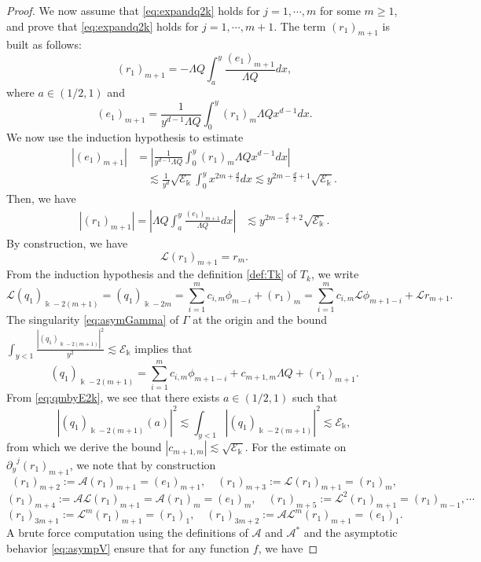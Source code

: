 \documentclass[11pt]{aims}
\theoremstyle{definition}
\numberwithin{equation}{section}
\begin{document}
\begin{proof}
We now assume that \eqref{eq:expandq2k} holds for $j = 1, \cdots, m$  for some $m \geq 1$, and prove that \eqref{eq:expandq2k} holds for $j = 1, \cdots, m + 1$. The term $(r_1)_{m + 1}$ is built as follows:
$$(r_1)_{m + 1} = - \Lambda Q\int_a^y \frac{(e_1)_{m + 1}}{\Lambda Q} dx,$$
where $a \in (1/2, 1)$ and 
$$(e_1)_{m + 1} = \frac{1}{y^{d-1}\Lambda Q}\int_0^y (r_1)_{m} \Lambda Q x^{d-1}dx.$$
We now use the induction hypothesis to estimate
\begin{align*}
|(e_1)_{m + 1}| &= \left|\frac{1}{y^{d-1} \Lambda Q}\int_0^y (r_1)_{m} \Lambda Q x^{d-1}dx \right| \\
&\quad \lesssim \frac{1}{y^d}\sqrt{{\mathscr{E}}_{\Bbbk}}\int_0^y x^{2m + \frac{d}{2}} dx \lesssim y^{2m - \frac{d}{2} + 1} \sqrt{{\mathscr{E}}_{\Bbbk}}.
\end{align*}
Then, we have
\begin{align*}
|(r_1)_{m + 1}| = \left|\Lambda Q\int_a^y \frac{(e_1)_{m +1}}{\Lambda Q} dx\right| &\lesssim y^{2m - \frac{d}{2} + 2} \sqrt{{\mathscr{E}}_\Bbbk}.
\end{align*}
By construction, we have 
$${\mathscr{L}} (r_1)_{m+1} = r_{m}.$$
From the induction hypothesis and the definition \eqref{def:Tk} of $T_k$, we write
$${\mathscr{L}} (q_1)_{\Bbbk - 2(m + 1)} = (q_1)_{\Bbbk - 2m} = \sum_{i = 1}^m c_{i,m}\phi_{m - i} + (r_1)_{m} = \sum_{i = 1}^mc_{i,m}{\mathscr{L}} \phi_{m + 1 - i} + {\mathscr{L}} r_{m + 1}.$$
The singularity \eqref{eq:asymGamma} of $\Gamma$ at the origin and the bound $\int_{y < 1} \frac{|(q_1)_{\Bbbk - 2(m+1)}|^2}{y^2} \lesssim {\mathscr{E}}_{\Bbbk}$ implies that
$$(q_1)_{\Bbbk - 2(m + 1)} = \sum_{i=1}^{m} c_{i,m}\phi_{m +1 - i}+ c_{m + 1, m}\Lambda Q +  (r_1)_{m + 1}.$$
From \eqref{eq:qmbyE2k}, we see that there exists $a \in (1/2,1)$ such that 
$$|(q_1)_{\Bbbk - 2(m+1)}(a)|^2 \lesssim \int_{y < 1}|(q_1)_{\Bbbk - 2(m+1)}|^2 \lesssim {\mathscr{E}}_{\Bbbk},$$
from which we derive the bound $|c_{m+1, m}| \lesssim \sqrt{{\mathscr{E}}_{\Bbbk}}$. For the estimate on ${\partial_y}^j (r_1)_{m+1}$, we note that by construction 
$$(r_1)_{m + 2}:= {\mathscr{A}} (r_1)_{m + 1} = (e_1)_{m+1}, \quad (r_1)_{m + 3}:= {\mathscr{L}} (r_1)_{m + 1} = (r_1)_{m},$$
$$(r_1)_{m + 4}:= {\mathscr{A}} {\mathscr{L}} (r_1)_{m + 1} = {\mathscr{A}} (r_1)_m = (e_1)_{m}, \quad (r_1)_{m + 5}:={\mathscr{L}}^{2}(r_1)_{m + 1} = (r_1)_{m - 1}, \cdots$$
$$(r_1)_{3m + 1}:={\mathscr{L}}^m (r_1)_{m + 1} = (r_1)_1, \quad  (r_1)_{3m + 2}:={\mathscr{A}}{\mathscr{L}}^{m}(r_1)_{m + 1}= (e_1)_1.$$
A brute force computation using the definitions of ${\mathscr{A}}$ and ${\mathscr{A}}^*$ and the asymptotic behavior \eqref{eq:asympV}  ensure that for any function $f$, we have

\end{proof}
\end{document}
